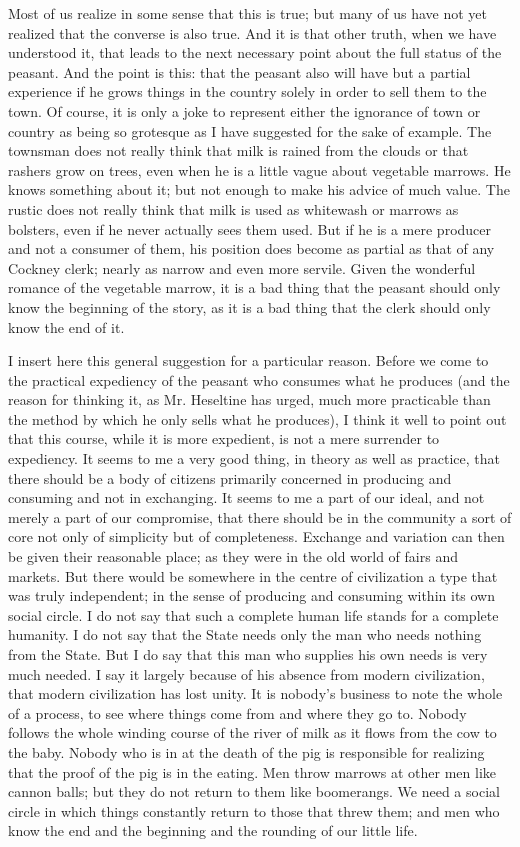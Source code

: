 \documentclass{book}
\begin{document}
Most of us realize in some sense that this is true; but many of us have not yet realized that the converse is also true. And it is that other truth, when we have understood it, that leads to the next necessary point about the full status of the peasant. And the point is this: that the peasant also will have but a partial experience if he grows things in the country solely in order to sell them to the town. Of course, it is only a joke to represent either the ignorance of town or country as being so grotesque as I have suggested for the sake of example. The townsman does not really think that milk is rained from the clouds or that rashers grow on trees, even when he is a little vague about vegetable marrows. He knows something about it; but not enough to make his advice of much value. The rustic does not really think that milk is used as whitewash or marrows as bolsters, even if he never actually sees them used. But if he is a mere producer and not a consumer of them, his position does become as partial as that of any Cockney clerk; nearly as narrow and even more servile. Given the wonderful romance of the vegetable marrow, it is a bad thing that the peasant should only know the beginning of the story, as it is a bad thing that the clerk should only know the end of it.

I insert here this general suggestion for a particular reason. Before we come to the practical expediency of the peasant who consumes what he produces (and the reason for thinking it, as Mr. Heseltine has urged, much more practicable than the method by which he only sells what he produces), I think it well to point out that this course, while it is more expedient, is not a mere surrender to expediency. It seems to me a very good thing, in theory as well as practice, that there should be a body of citizens primarily concerned in producing and consuming and not in exchanging. It seems to me a part of our ideal, and not merely a part of our compromise, that there should be in the community a sort of core not only of simplicity but of completeness. Exchange and variation can then be given their reasonable place; as they were in the old world of fairs and markets. But there would be somewhere in the centre of civilization a type that was truly independent; in the sense of producing and consuming within its own social circle. I do not say that such a complete human life stands for a complete humanity. I do not say that the State needs only the man who needs nothing from the State. But I do say that this man who supplies his own needs is very much needed. I say it largely because of his absence from modern civilization, that modern civilization has lost unity. It is nobody’s business to note the whole of a process, to see where things come from and where they go to. Nobody follows the whole winding course of the river of milk as it flows from the cow to the baby. Nobody who is in at the death of the pig is responsible for realizing that the proof of the pig is in the eating. Men throw marrows at other men like cannon balls; but they do not return to them like boomerangs. We need a social circle in which things constantly return to those that threw them; and men who know the end and the beginning and the rounding of our little life.
\end{document}
